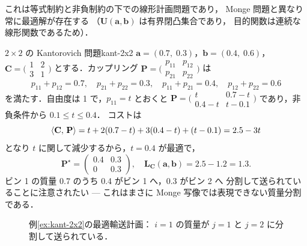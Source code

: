 これは等式制約と非負制約の下での線形計画問題であり，
Monge 問題と異なり常に最適解が存在する
（$\mathbf{U}(\mathbf{a}, \mathbf{b})$ は有界閉凸集合であり，
目的関数は連続な線形関数であるため）．

\begin{example}{$2 \times 2$ の Kantorovich 問題}{kant-2x2}
$\mathbf{a} = (0.7,\; 0.3)$，$\mathbf{b} = (0.4,\; 0.6)$，
$\mathbf{C} = \bigl(\begin{smallmatrix} 1 & 2 \\ 3 & 1 \end{smallmatrix}\bigr)$
とする．カップリング $\mathbf{P} = \bigl(\begin{smallmatrix} p_{11} & p_{12} \\ p_{21} & p_{22} \end{smallmatrix}\bigr)$ は
\[
  p_{11} + p_{12} = 0.7, \quad
  p_{21} + p_{22} = 0.3, \quad
  p_{11} + p_{21} = 0.4, \quad
  p_{12} + p_{22} = 0.6
\]
を満たす．自由度は 1 で，$p_{11} = t$ とおくと
$\mathbf{P} = \bigl(\begin{smallmatrix} t & 0.7-t \\ 0.4-t & t-0.1 \end{smallmatrix}\bigr)$
であり，非負条件から $0.1 \leq t \leq 0.4$．
コストは
\[
  \langle \mathbf{C},\, \mathbf{P} \rangle = t + 2(0.7-t) + 3(0.4-t) + (t-0.1)
  = 2.5 - 3t
\]
となり $t$ に関して減少するから，$t = 0.4$ が最適で，
\[
  \mathbf{P}^\star = \begin{pmatrix} 0.4 & 0.3 \\ 0 & 0.3 \end{pmatrix},
  \quad
  \mathbf{L_C}(\mathbf{a}, \mathbf{b}) = 2.5 - 1.2 = 1.3.
\]
ビン 1 の質量 0.7 のうち 0.4 がビン 1 へ，0.3 がビン 2 へ
分割して送られていることに注意されたい
--- これはまさに Monge 写像では表現できない質量分割である．
\end{example}

\begin{figure}[htbp]
\centering
{}
\caption{例\ref{ex:kant-2x2}の最適輸送計画：
$i=1$ の質量が $j=1$ と $j=2$ に分割して送られている．}
\label{fig:kant-2x2}
\end{figure}


